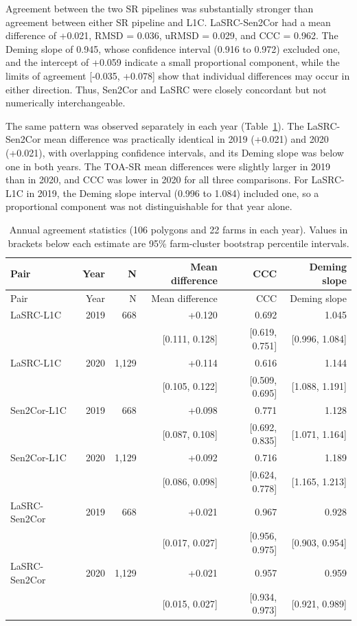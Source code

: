 \documentclass[remotesensing,article,submit,pdftex,oneauthor]{Definitions/mdpi}
\begin{document}
Agreement between the two SR pipelines was substantially stronger than
agreement between either SR pipeline and L1C. LaSRC-Sen2Cor had a mean
difference of +0.021, RMSD = 0.036, uRMSD = 0.029, and CCC = 0.962. The
Deming slope of 0.945, whose confidence interval (0.916 to 0.972)
excluded one, and the intercept of +0.059 indicate a small proportional
component, while the limits of agreement {[}-0.035, +0.078{]} show that
individual differences may occur in either direction. Thus, Sen2Cor and
LaSRC were closely concordant but not numerically interchangeable.

The same pattern was observed separately in each year
(Table~\ref{tbl-agreement-annual}). The LaSRC-Sen2Cor mean difference
was practically identical in 2019 (+0.021) and 2020 (+0.021), with
overlapping confidence intervals, and its Deming slope was below one in
both years. The TOA-SR mean differences were slightly larger in 2019
than in 2020, and CCC was lower in 2020 for all three comparisons. For
LaSRC-L1C in 2019, the Deming slope interval (0.996 to 1.084) included
one, so a proportional component was not distinguishable for that year
alone.

\begin{longtable}[]{@{}lrrrrr@{}}
\caption{Annual agreement statistics (106 polygons and 22 farms in each
year). Values in brackets below each estimate are 95\% farm-cluster
bootstrap percentile
intervals.}\label{tbl-agreement-annual}\tabularnewline
\toprule\noalign{}
Pair & Year & N & Mean difference & CCC & Deming slope \\
\midrule\noalign{}
\endfirsthead
\toprule\noalign{}
Pair & Year & N & Mean difference & CCC & Deming slope \\
\midrule\noalign{}
\endhead
\bottomrule\noalign{}
\endlastfoot
LaSRC-L1C & 2019 & 668 & +0.120 & 0.692 & 1.045 \\
& & & {[}0.111, 0.128{]} & {[}0.619, 0.751{]} & {[}0.996, 1.084{]} \\
LaSRC-L1C & 2020 & 1,129 & +0.114 & 0.616 & 1.144 \\
& & & {[}0.105, 0.122{]} & {[}0.509, 0.695{]} & {[}1.088, 1.191{]} \\
Sen2Cor-L1C & 2019 & 668 & +0.098 & 0.771 & 1.128 \\
& & & {[}0.087, 0.108{]} & {[}0.692, 0.835{]} & {[}1.071, 1.164{]} \\
Sen2Cor-L1C & 2020 & 1,129 & +0.092 & 0.716 & 1.189 \\
& & & {[}0.086, 0.098{]} & {[}0.624, 0.778{]} & {[}1.165, 1.213{]} \\
LaSRC-Sen2Cor & 2019 & 668 & +0.021 & 0.967 & 0.928 \\
& & & {[}0.017, 0.027{]} & {[}0.956, 0.975{]} & {[}0.903, 0.954{]} \\
LaSRC-Sen2Cor & 2020 & 1,129 & +0.021 & 0.957 & 0.959 \\
& & & {[}0.015, 0.027{]} & {[}0.934, 0.973{]} & {[}0.921, 0.989{]} \\
\end{longtable}
\end{document}
